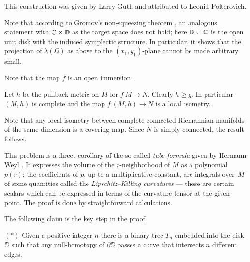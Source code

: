 This construction was given 
by Larry Guth \cite{guth-symplectic}
and attributed to Leonid Polterovich.

Note that according to Gromov's non-squeezing theorem \cite{gromov-pseudoholomorphic}, 
an analogous statement with $\mathbb{C}\times \mathbb{D}$ as the target space does not hold;
here $\mathbb{D}\subset \mathbb{C}$ is the open unit disk with the induced symplectic structure.
In particular, it shows that
the projection of $\lambda(\Omega)$ as above 
to the $(x_1,y_1)$-plane
cannot be made arbitrary small.

Note that the map $f$ is an open immersion.

Let $h$ be the pullback metric on $M$ for $f\:M\to N$.
Clearly $h\ge g$.
In particular $(M,h)$ is complete and the map $f\:(M,h)\to N$ is a local isometry. 

Note that any local isometry between complete connected Riemannian manifolds of the same dimension is a covering map.
Since $N$ is simply connected, the result follows.
\qeds 


This problem is a direct corollary of the so called \emph{tube formula} given by Hermann Weyl \cite{weyl}.
It expresses the volume of the $r$-neighborhood of $M$ as a polynomial $p(r)$;
the coefficients of $p$, up to a multiplicative constant, are integrals over~$M$ of some quantities called the \emph{Lipschitz--Killing curvatures} --- these are certain scalars which can be expressed in terms of the curvature tensor at the given point.
The proof is done by straightforward calculations.

 


The following claim is the key step in the proof.
\begin{cl}{$({*})$}
Given a positive integer $n$ there is a binary tree $T_n$ embedded into the disk $\DD$ such that any null-homotopy of $\partial \DD$ passes a curve that intersects $n$ different edges.
\end{cl}



